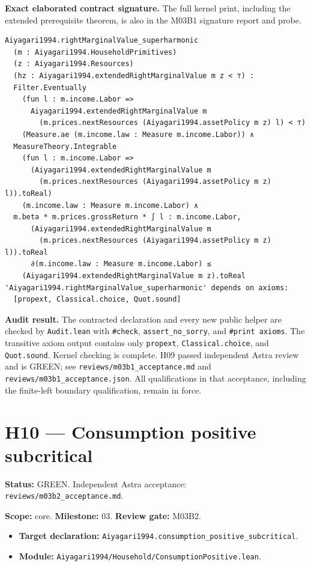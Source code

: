 \documentclass[
  11pt,
]{article}
\providecommand{\tightlist}{%
  \setlength{\itemsep}{0pt}\setlength{\parskip}{0pt}}
\let\LedgerOriginalTexttt\texttt
\renewcommand{\texttt}[1]{{\small\LedgerOriginalTexttt{#1}}}
\begin{document}
\textbf{Exact elaborated contract signature.} The full kernel print,
including the extended prerequisite theorem, is also in the M03B1
signature report and probe.

\begin{verbatim}
Aiyagari1994.rightMarginalValue_superharmonic
  (m : Aiyagari1994.HouseholdPrimitives)
  (z : Aiyagari1994.Resources)
  (hz : Aiyagari1994.extendedRightMarginalValue m z < ⊤) :
  Filter.Eventually
    (fun l : m.income.Labor =>
      Aiyagari1994.extendedRightMarginalValue m
        (m.prices.nextResources (Aiyagari1994.assetPolicy m z) l) < ⊤)
    (Measure.ae (m.income.law : Measure m.income.Labor)) ∧
  MeasureTheory.Integrable
    (fun l : m.income.Labor =>
      (Aiyagari1994.extendedRightMarginalValue m
        (m.prices.nextResources (Aiyagari1994.assetPolicy m z) l)).toReal)
    (m.income.law : Measure m.income.Labor) ∧
  m.beta * m.prices.grossReturn * ∫ l : m.income.Labor,
      (Aiyagari1994.extendedRightMarginalValue m
        (m.prices.nextResources (Aiyagari1994.assetPolicy m z) l)).toReal
      ∂(m.income.law : Measure m.income.Labor) ≤
    (Aiyagari1994.extendedRightMarginalValue m z).toReal
'Aiyagari1994.rightMarginalValue_superharmonic' depends on axioms:
  [propext, Classical.choice, Quot.sound]
\end{verbatim}

\textbf{Audit result.} The contracted declaration and every new public
helper are checked by \texttt{Audit.lean} with \texttt{\#check},
\texttt{assert\_no\_sorry}, and \texttt{\#print\ axioms}. The transitive
axiom output contains only \texttt{propext}, \texttt{Classical.choice},
and \texttt{Quot.sound}. Kernel checking is complete. H09 passed
independent Astra review and is GREEN; see
\texttt{reviews/m03b1\_acceptance.md} and
\texttt{reviews/m03b1\_acceptance.json}. All qualifications in that
acceptance, including the finite-left boundary qualification, remain in
force.

\section{H10 --- Consumption positive
subcritical}\label{h10-consumption-positive-subcritical}

\textbf{Status:} GREEN. Independent Astra acceptance:
\texttt{reviews/m03b2\_acceptance.md}.

\textbf{Scope:} core. \textbf{Milestone:} 03. \textbf{Review gate:}
M03B2.

\begin{itemize}
\tightlist
\item
  \textbf{Target declaration:}
  \texttt{Aiyagari1994.consumption\_positive\_subcritical}.
\item
  \textbf{Module:}
  \texttt{Aiyagari1994/Household/ConsumptionPositive.lean}.
\end{itemize}
\end{document}
